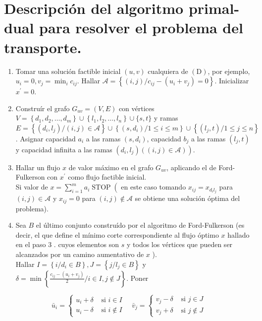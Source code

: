 \documentclass[10pt]{article}
\begin{document}
\section*{Descripción del algoritmo primal-dual para resolver el problema del transporte.}
\begin{enumerate}
  \item Tomar una solución factible inicial $(u, v)$ cualquiera de $(\mathrm{D})$, por ejemplo, $u_{i}=0, v_{j}=\min _{i} c_{i j}$. Hallar $\mathcal{A}=\left\{(i, j) / c_{i j}-\left(u_{i}+v_{j}\right)=0\right\}$. Inicializar $x^{\prime}=0$.
  \item Construír el grafo $G_{u v}=(V, E)$ con vértices $V=\left\{d_{1}, d_{2}, \ldots, d_{m}\right\} \cup\left\{l_{1}, l_{2}, \ldots, l_{n}\right\} \cup\{s, t\}$ y ramas $E=\left\{\left(d_{i}, l_{j}\right) /(i, j) \in \mathcal{A}\right\} \cup\left\{\left(s, d_{i}\right) / 1 \leq i \leq m\right\} \cup\left\{\left(l_{j}, t\right) / 1 \leq j \leq n\right\}$. Asignar capacidad $a_{i}$ a las ramas $\left(s, d_{i}\right)$, capacidad $b_{j}$ a las ramas $\left(l_{j}, t\right)$ y capacidad infinita a las ramas $\left.\left(d_{i}, l_{j}\right)((i, j) \in \mathcal{A})\right)$.
  \item Hallar un flujo $x$ de valor máximo en el grafo $G_{u v}$, aplicando el de Ford-Fulkerson con $x^{\prime}$ como flujo factible inicial.\\
Si valor de $x=\sum_{i=1}^{m} a_{i} \operatorname{STOP}\left(\right.$ en este caso tomando $x_{i j}=x_{d_{i} l_{j}}$ para $(i, j) \in \mathcal{A}$ y $x_{i j}=0$ para $(i, j) \notin \mathcal{A}$ se obtiene una solución óptima del problema).
  \item Sea $B$ el último conjunto construído por el algoritmo de Ford-Fulkerson (es decir, el que define el mínimo corte correspondiente al flujo óptimo $x$ hallado en el paso 3 . cuyos elementos son $s$ y todos los vértices que pueden ser alcanzados por un camino aumentativo de $x$ ).\\
Hallar $I=\left\{i / d_{i} \in B\right\}, J=\left\{j / l_{j} \in B\right\}$ y $\delta=\min \left\{\frac{c_{i j}-\left(u_{i}+v_{j}\right)}{2} / i \in I, j \notin J\right\}$. Poner
\end{enumerate}

$$
\bar{u}_{i}=\left\{\begin{array}{ll}
u_{i}+\delta & \text { si } i \in I \\
u_{i}-\delta & \text { si } i \notin I
\end{array} \quad \bar{v}_{j}= \begin{cases}v_{j}-\delta & \text { si } j \in J \\
v_{j}+\delta & \text { si } j \notin J\end{cases}\right.
$$
\end{document}
